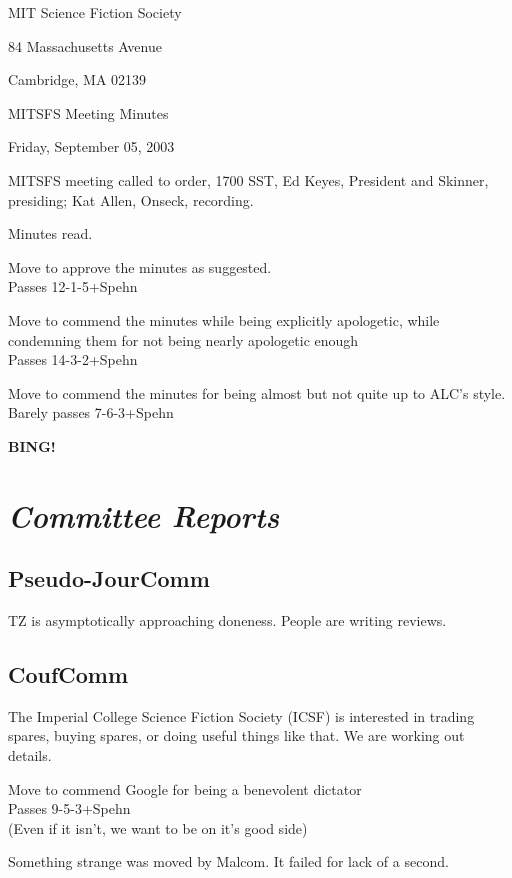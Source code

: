 \documentclass[10pt]{article}
\newcommand{\bing}{{\bf BING!} }
\newcommand{\goto}[1]{\bing \vskip 12pt \section*{{\em{#1}}}}
\begin{document}
\begin{center}

MIT Science Fiction Society 

84 Massachusetts Avenue

Cambridge, MA 02139

\vspace{12pt}

MITSFS Meeting Minutes 

Friday, September 05, 2003

\end{center}
 
\vspace{18pt}

\setlength{\parskip}{6pt}

\noindent
MITSFS meeting called to order, 1700 SST, Ed Keyes, President and
Skinner, presiding; Kat Allen,  Onseck, recording.

Minutes read.

Move to approve the minutes as suggested.\\
Passes 12-1-5+Spehn

Move to commend the minutes while being explicitly apologetic, while
condemning them for not being nearly apologetic enough\\
Passes 14-3-2+Spehn

Move to commend the minutes for being almost but not quite up to ALC's style.\\
Barely passes 7-6-3+Spehn



\goto{Committee Reports}
\subsection*{Pseudo-JourComm }
TZ is asymptotically approaching doneness.
People are writing reviews.

\subsection*{CoufComm }
The Imperial College Science Fiction Society (ICSF)
is interested in trading spares, buying spares, or doing useful
things like that.  We are working out details.

Move to commend Google for being a benevolent dictator\\
Passes 9-5-3+Spehn\\
(Even if it isn't, we want to be on it's good side)

Something strange was moved by Malcom. It failed for lack of a second.
\end{document}
